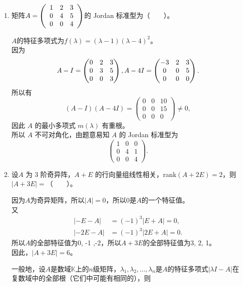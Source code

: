 \begin{enumerate}[1~]
\begin{enumerate}[1.~]
\item
矩阵$A = \left( \begin{array} { l l l } { 1 } & { 2 } & { 3 } \\ { 0 } & { 4 } & { 5 } \\ { 0 } & { 0 } & { 4 } \end{array} \right)$的 Jordan 标准型为（\ \ \ \ ）。
\begin{solution}
$A$的特征多项式为$f( \lambda) = (\lambda -1)(\lambda -4)^2$。\\
因为\[
A-I = \left( \begin{matrix}
0& 2& 3\\
0& 3& 5\\
0& 0& 3
\end{matrix} \right),\\
A-4I = \left( \begin{matrix}
-3& 2& 3\\
0& 0& 5\\
0& 0& 0
\end{matrix} \right).
\]
所以有\[
(A-I)(A-4I) = \left( \begin{matrix}
0& 0& 10\\
0& 0& 15\\
0& 0& 0
\end{matrix} \right)\ne 0,
\]
因此 $A$ 的最小多项式 $m(\lambda)$ 有重根。\\
所以 $A$ 不可对角化，由题意易知 $A$ 的 Jordan 标准型为\[
\left( \begin{matrix}
1& 0& 0\\
0& 4& 1\\
0& 0& 4
\end{matrix} \right).
\]
\end{solution}
\item
设$A$ 为 $3$ 阶奇异阵，$A + E$ 的行向量组线性相关，rank$(A + 2E) = 2$，则 $|A + 3E| = $（\ \ \ \ ）。
\begin{solution}
因为$A$为奇异矩阵，所以$|A| = 0$，所以0是$A$的一个特征值。\\
又\begin{align*}
|-E-A| &= (-1)^3 |E+A| = 0,\\
|-2E-A| &= (-1)^3 |2E+A| = 0.
\end{align*}
所以$A$的全部特征值为0, -1 ,-2，所以$A+3E$的全部特征值为3, 2, 1。\\
因此，$|A+3E| = 6$。
\end{solution}
\begin{remark}
一般地，设$A$是数域$\mathbb{K}$上的$n$级矩阵，$\lambda_1, \lambda_2, \dots, \lambda_n$是$A$的特征多项式$|\lambda I-A|$在复数域中的全部根（它们中可能有相同的），则\\

\end{remark}
\end{enumerate}
\end{enumerate}
